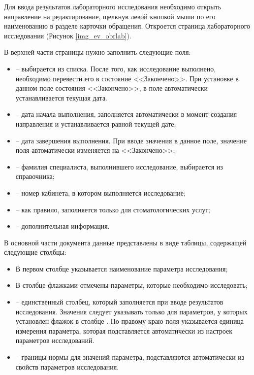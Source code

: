 {{Для ввода результатов лабораторного исследования необходимо открыть направление на редактирование, щелкнув левой кнопкой мыши по его наименованию в разделе  карточки обращения. Откроется страница лабораторного исследования (Рисунок \ref{img_ev_obrlab}). 

В верхней части страницы нужно заполнить следующие поля: 

\begin{itemize}
 \item {} – выбирается из списка. После того, как  исследование выполнено, необходимо перевести его в состояние <<Закончено>>. При установке в данном поле состояния <<Закончено>>, в поле  автоматически устанавливается текущая дата.
 \item {} – дата начала выполнения, заполняется автоматически в момент создания направления и устанавливается равной текущей дате;
 \item {} – дата завершения выполнения. При вводе значения в данное поле, значение поля   автоматически изменяется на <<Закончено>>;
 \item {} – фамилия специалиста, выполнившего исследование, выбирается из справочника;
 \item {} – номер кабинета, в котором выполняется исследование;
 \item {} – как правило, заполняется только для стоматологических услуг;
 \item {} – дополнительная информация.
\end{itemize}

В основной части документа данные представлены в виде таблицы, содержащей следующие столбцы: 

\begin{itemize}
 \item В первом столбце указывается наименование параметра исследования;
 \item В столбце  флажками отмечены параметры, которые необходимо исследовать;
 \item {} -- единственный столбец, который заполняется при вводе результатов исследования. Значения следует указывать только для параметров, у которых установлен флажок в столбце . По правому краю поля указывается единица измерения параметра, которая подставляется автоматически из настроек параметров исследований.
 \item {} -- границы нормы для значений параметра, подставляются автоматически из свойств параметров исследования.
\end{itemize}

}}
